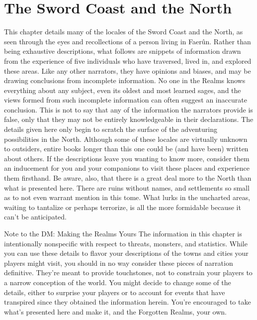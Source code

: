 \documentclass[10pt,a4paper,twoside,twocolumn,openany,bg=print,nodeprecatedcode]{dndbook}
\begin{document}
\chapter{The Sword Coast and the North}
This chapter details many of the locales of the Sword Coast and the North, as seen through the eyes and recollections of a person living in Faerûn. Rather than being exhaustive descriptions, what follows are snippets of information drawn from the experience of five individuals who have traversed, lived in, and explored these areas. Like any other narrators, they have opinions and biases, and may be drawing conclusions from incomplete information. No one in the Realms knows everything about any subject, even its oldest and most learned sages, and the views formed from such incomplete information can often suggest an inaccurate conclusion. This is not to say that any of the information the narrators provide is false, only that they may not be entirely knowledgeable in their declarations.
The details given here only begin to scratch the surface of the adventuring possibilities in the North. Although some of these locales are virtually unknown to outsiders, entire books longer than this one could be (and have been) written about others. If the descriptions leave you wanting to know more, consider them an inducement for you and your companions to visit these places and experience them firsthand.
Be aware, also, that there is a great deal more to the North than what is presented here. There are ruins without names, and settlements so small as to not even warrant mention in this tome. What lurks in the uncharted areas, waiting to tantalize or perhaps terrorize, is all the more formidable because it can't be anticipated.
\begin{DndComment}{Note to the DM: Making the Realms Yours}
The information in this chapter is intentionally nonspecific with respect to threats, monsters, and statistics. While you can use these details to flavor your descriptions of the towns and cities your players might visit, you should in no way consider these pieces of narration definitive. They're meant to provide touchstones, not to constrain your players to a narrow conception of the world.
You might decide to change some of the details, either to surprise your players or to account for events that have transpired since they obtained the information herein. You're encouraged to take what's presented here and make it, and the Forgotten Realms, your own.
\end{DndComment}
\end{document}
